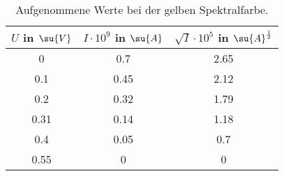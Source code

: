 \begin{table}
  \centering
  \label{tab:Gelb}
  \caption{Aufgenommene Werte bei der gelben Spektralfarbe.}
  \begin{tabular}{c c c }
    \toprule
    $U$ in $\su{V}$ & $I\cdot 10^{9}$ in $\su{A}$ & $\sqrt{I}\cdot10^{5}$ in $\su{A}^{\frac{1}{2}}$ \\
    \midrule
     0     & 0.7  & 2.65 \\
     0.1   & 0.45 & 2.12 \\
     0.2   & 0.32 & 1.79 \\
     0.31  & 0.14 & 1.18 \\
     0.4   & 0.05 & 0.7  \\
     0.55  & 0    & 0    \\
     \bottomrule
   \end{tabular}
 \end{table}
